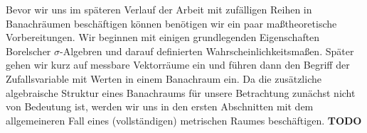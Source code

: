 Bevor wir uns im späteren Verlauf der Arbeit mit zufälligen Reihen in Banachräumen beschäftigen können benötigen wir ein paar maßtheoretische Vorbereitungen. 
Wir beginnen mit einigen grundlegenden Eigenschaften Borelscher $\sigma$-Algebren und darauf definierten Wahrscheinlichkeitsmaßen. 
Später gehen wir kurz auf messbare Vektorräume ein und führen dann den Begriff der Zufallsvariable mit Werten in einem Banachraum ein. 
Da die zusätzliche algebraische Struktur eines Banachraums für unsere Betrachtung zunächst nicht von Bedeutung ist, 
werden wir uns in den ersten Abschnitten mit dem allgemeineren Fall eines (vollständigen) metrischen Raumes beschäftigen.
\textbf{TODO}